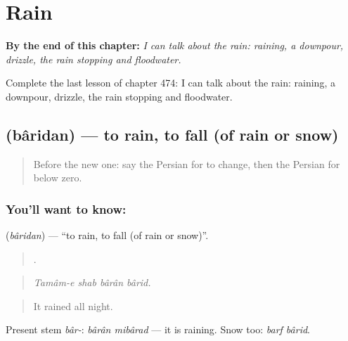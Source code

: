 
\chapter{Rain}
\label{ch:fa-rain}

\begin{chapteropening}
\textbf{By the end of this chapter:} \emph{I can talk about the rain: raining, a downpour, drizzle, the rain stopping and floodwater.}

Complete the last lesson of chapter 474: I can talk about the rain: raining, a downpour, drizzle, the rain stopping and floodwater.
\end{chapteropening}

\section[\texorpdfstring{\fa{باریدن} (bâridan)}{باریدن (bâridan)}]{ (bâridan) — to rain, to fall (of rain or snow)}

\label{lesson:FA-C474-baridan}



\begin{quote}
Before the new one: say the Persian for to change, then the Persian for below zero.
\end{quote}

\subsection*{You'll want to know: }
\textbf{} (\emph{bâridan}) — \textquotedblleft{}to rain, to fall (of rain or snow)\textquotedblright{}.

\begin{quote}
   .
\end{quote}

\begin{quote}
\emph{Tamâm-e shab bârân bârid.}
\end{quote}

\begin{quote}
It rained all night.
\end{quote}

Present stem \emph{bâr-}: \emph{bârân mibârad} — it is raining. Snow too: \emph{barf bârid}.

